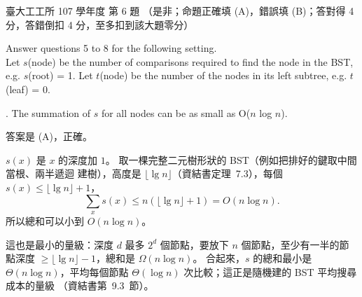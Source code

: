 \begin{pastexam}[label={px:ntu-107-ie-ds-06}]{臺大工工所 107 學年度 第 6 題}
（是非；命題正確填 (A)，錯誤填 (B)；答對得 4 分，答錯倒扣 4 分，至多扣到該大題零分）

Answer questions 5 to 8 for the following setting.\\
Let $s$(node) be the number of comparisons required to find the node in the BST, e.g. $s$(root) = 1. Let $t$(node) be the number of the nodes in its left subtree, e.g. $t$(leaf) = 0.

. The summation of $s$ for all nodes can be as small as O($n$ log $n$).
\end{pastexam}

\begin{pastsoln}
答案是 (A)，正確。

$s(x)$ 是 $x$ 的深度加 $1$。 取一棵完整二元樹形狀的 BST（例如把排好的鍵取中間當根、兩半遞迴
建樹），高度是 $\lfloor \lg n \rfloor$（資結書定理~7.3），每個 $s(x) \le \lfloor \lg n \rfloor + 1$，
\[
\sum_{x} s(x) \le n(\lfloor \lg n \rfloor + 1) = O(n \log n).
\]
所以總和可以小到 $O(n \log n)$。

這也是最小的量級：深度 $d$ 最多 $2^d$ 個節點，要放下 $n$ 個節點，至少有一半的節點深度
$\ge \lfloor \lg n \rfloor - 1$，總和是 $\Omega(n \log n)$。 合起來，$s$ 的總和最小是
$\Theta(n \log n)$，平均每個節點 $\Theta(\log n)$ 次比較；這正是隨機建的 BST 平均搜尋成本的量級
（資結書第~9.3~節）。
\end{pastsoln}
